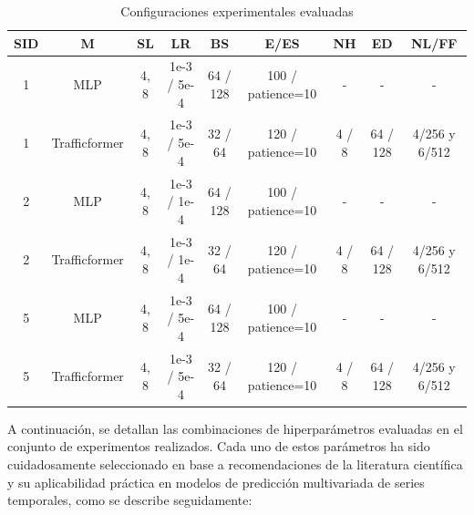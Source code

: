 \begin{table}[H]
	\centering
	\small
	\caption{Configuraciones experimentales evaluadas}
	\label{tab:experimentos_resumen}
	\begin{tabularx}{\textwidth}{c | c | c | c | c | c | c | c | c}
		\toprule
		\textbf{SID} & \textbf{M} & \textbf{SL} & \textbf{LR} & \textbf{BS} & \textbf{E/ES} & \textbf{NH} & \textbf{ED} & \textbf{NL/FF} \\
		\midrule
		1 & MLP           & 4, 8 & 1e-3 / 5e-4 & 64 / 128 & 100 / patience=10 & -      & -       & - \\
		1 & Trafficformer & 4, 8 & 1e-3 / 5e-4 & 32 / 64  & 120 / patience=10 & 4 / 8  & 64 / 128 & 4/256 y 6/512 \\
		2 & MLP           & 4, 8 & 1e-3 / 1e-4 & 64 / 128 & 100 / patience=10 & -      & -       & - \\
		2 & Trafficformer & 4, 8 & 1e-3 / 1e-4 & 32 / 64  & 120 / patience=10 & 4 / 8  & 64 / 128 & 4/256 y 6/512 \\
		5 & MLP           & 4, 8 & 1e-3 / 5e-4 & 64 / 128 & 100 / patience=10 & -      & -       & - \\
		5 & Trafficformer & 4, 8 & 1e-3 / 5e-4 & 32 / 64  & 120 / patience=10 & 4 / 8  & 64 / 128 & 4/256 y 6/512 \\
		\bottomrule
	\end{tabularx}
\end{table}

A continuación, se detallan las combinaciones de hiperparámetros evaluadas en el conjunto de experimentos realizados. Cada uno de estos parámetros ha sido cuidadosamente seleccionado en base a recomendaciones de la literatura científica y su aplicabilidad práctica en modelos de predicción multivariada de series temporales, como se describe seguidamente:

